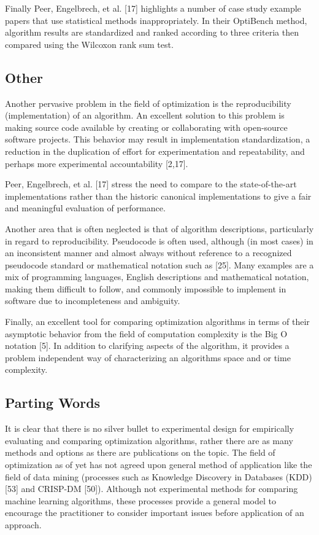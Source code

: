 \documentclass[a4paper, 11pt]{article}
\begin{document}
Finally Peer, Engelbrech, et al. [17] highlights a number of case study example papers that use statistical methods inappropriately. In their OptiBench method, algorithm results are standardized and ranked according to three criteria then compared using the Wilcoxon rank sum test.

% 
% 
\subsection{Other}
Another pervasive problem in the field of optimization is the reproducibility (implementation) of an algorithm. An excellent solution to this problem is making source code available by creating or collaborating with open-source software projects. This behavior may result in implementation standardization, a reduction in the duplication of effort for experimentation and repeatability, and perhaps more experimental accountability [2,17].

Peer, Engelbrech, et al. [17] stress the need to compare to the state-of-the-art implementations rather than the historic canonical implementations to give a fair and meaningful evaluation of performance.

Another area that is often neglected is that of algorithm descriptions, particularly in regard to reproducibility. Pseudocode is often used, although (in most cases) in an inconsistent manner and almost always without reference to a recognized pseudocode standard or mathematical notation such as [25]. Many examples are a mix of programming languages, English descriptions and mathematical notation, making them difficult to follow, and commonly impossible to implement in software due to incompleteness and ambiguity.

Finally, an excellent tool for comparing optimization algorithms in terms of their asymptotic behavior from the field of computation complexity is the Big O notation [5]. In addition to clarifying aspects of the algorithm, it provides a problem independent way of characterizing an algorithms space and or time complexity.


% 
% 
\subsection{Parting Words}
It is clear that there is no silver bullet to experimental design for empirically evaluating and comparing optimization algorithms, rather there are as many methods and options as there are publications on the topic. The field of optimization as of yet has not agreed upon general method of application like the field of data mining (processes such as Knowledge Discovery in Databases (KDD) [53] and CRISP-DM [50]). Although not experimental methods for comparing machine learning algorithms, these processes provide a general model to encourage the practitioner to consider important issues before application of an approach.
\end{document}
